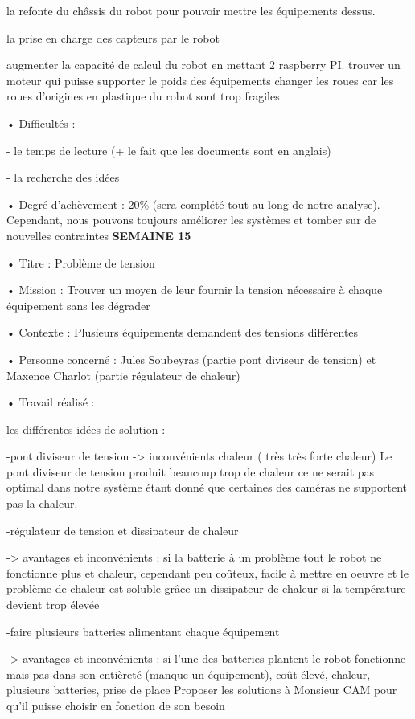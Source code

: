 \documentclass{PackagerQualityN}
\begin{document}
la refonte du châssis du robot pour pouvoir mettre les équipements dessus.

la prise en charge des capteurs par le robot

 	augmenter la capacité de calcul du robot en mettant 2 raspberry PI.
	trouver un moteur qui puisse supporter le poids des équipements
	changer les roues car les roues d’origines en plastique du robot sont trop fragiles


• Difficultés :

- le temps de lecture (+ le fait que les documents sont en anglais)

- la recherche des idées

• Degré d’achèvement : 20\% (sera complété tout au long de notre analyse). Cependant, nous pouvons toujours améliorer les systèmes et tomber sur de nouvelles contraintes
\newp
\textbf{SEMAINE 15}

• Titre : Problème de tension

• Mission : Trouver un moyen de leur fournir la tension nécessaire à chaque équipement sans les dégrader 

• Contexte : Plusieurs équipements demandent des tensions différentes

• Personne concerné : Jules Soubeyras (partie pont diviseur de tension) et Maxence Charlot (partie régulateur de chaleur)

• Travail réalisé :

 les différentes idées de solution :
 
-pont diviseur de tension
-> inconvénients chaleur ( très très forte chaleur)
	Le pont diviseur de tension produit beaucoup trop de chaleur ce ne serait pas optimal dans notre système étant donné que certaines des caméras ne supportent pas la chaleur.
	
-régulateur de tension et dissipateur de chaleur

 -> avantages et inconvénients : si la batterie à un problème tout le robot ne fonctionne plus et chaleur, cependant peu coûteux, facile à mettre en oeuvre et le problème de chaleur est soluble grâce un dissipateur de chaleur si la température devient trop élevée
 
-faire plusieurs batteries alimentant chaque équipement

-> avantages et inconvénients : si l'une des batteries plantent le robot fonctionne mais pas dans son entièreté (manque un équipement), coût élevé, chaleur, plusieurs batteries, prise de place
Proposer les solutions à Monsieur CAM pour qu’il puisse choisir en fonction de son besoin
\end{document}
